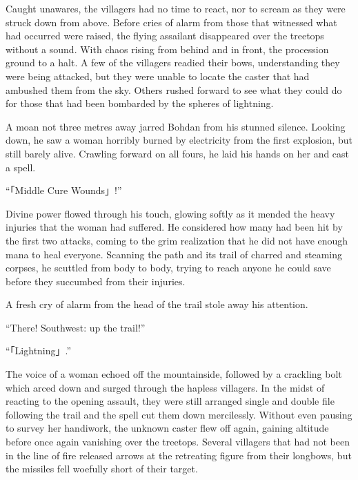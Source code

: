  

Caught unawares, the villagers had no time to react, nor to scream as they were struck down from above. Before cries of alarm from those that witnessed what had occurred were raised, the flying assailant disappeared over the treetops without a sound. With chaos rising from behind and in front, the procession ground to a halt. A few of the villagers readied their bows, understanding they were being attacked, but they were unable to locate the caster that had ambushed them from the sky. Others rushed forward to see what they could do for those that had been bombarded by the spheres of lightning.

 

A moan not three metres away jarred Bohdan from his stunned silence. Looking down, he saw a woman horribly burned by electricity from the first explosion, but still barely alive. Crawling forward on all fours, he laid his hands on her and cast a spell.

 

“「Middle Cure Wounds」!”

 

Divine power flowed through his touch, glowing softly as it mended the heavy injuries that the woman had suffered. He considered how many had been hit by the first two attacks, coming to the grim realization that he did not have enough mana to heal everyone. Scanning the path and its trail of charred and steaming corpses, he scuttled from body to body, trying to reach anyone he could save before they succumbed from their injuries.

 

A fresh cry of alarm from the head of the trail stole away his attention.

 

“There! Southwest: up the trail!”

 

“「Lightning」.”

 

The voice of a woman echoed off the mountainside, followed by a crackling bolt which arced down and surged through the hapless villagers. In the midst of reacting to the opening assault, they were still arranged single and double file following the trail and the spell cut them down mercilessly. Without even pausing to survey her handiwork, the unknown caster flew off again, gaining altitude before once again vanishing over the treetops. Several villagers that had not been in the line of fire released arrows at the retreating figure from their longbows, but the missiles fell woefully short of their target.

